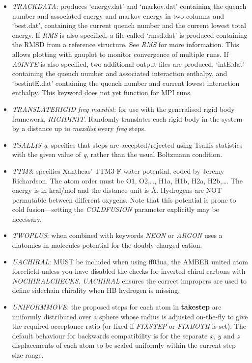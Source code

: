 \documentclass[12pt,a4paper,dvips]{article}
\begin{document}
\begin{itemize}
\item {\it TRACKDATA}: produces `energy.dat' and `markov.dat' containing the quench number and 
associated energy and markov energy in two columns and `best.dat', containing the current quench number and the current lowest
total energy. If {\it RMS\/} is also specified, a file called `rmsd.dat' is produced containing the RMSD from a reference structure.
See {\it RMS\/} for more information. This allows plotting with gnuplot to monitor convergence of multiple runs.
If {\it A9INTE} is also specified, two additional output files are produced, `intE.dat' containing the quench number and associated interaction
enthalpy, and `bestintE.dat' containing the quench number and current lowest interaction enthalpy. This keyword does not yet function for MPI runs.

\item {\it TRANSLATERIGID freq maxdist}: for use with the generalised rigid
body framework, {\it RIGIDINIT}. Randomly translates each rigid body in the
system by a distance up to {\it maxdist} every {\it freq} steps.

\item {\it TSALLIS q\/}: specifies that steps are accepted/rejected using Tsallis statistics with the
given value of {\it q\/}, rather than the usual Boltzmann condition.

\item {\it TTM3\/}: specifies Xantheas' TTM3-F water potential, coded
by Jeremy Richardson.
The atom order must be O1, O2,\ldots, H1a, H1b, H2a, H2b,\ldots.
The energy is in kcal/mol and the distance unit is \AA.
Hydrogens are NOT permutable between different oxygens.
Note that this potential is prone to cold fusion---setting the {\it COLDFUSION\/}
parameter explicitly may be necessary.

\item {\it TWOPLUS\/}: when combined with keywords {\it NEON\/} or {\it ARGON\/}
uses a diatomics-in-molecules potential for the doubly charged cation.

\item {\it UACHIRAL\/}: MUST be included when using ff03ua, the AMBER united atom forcefield unless you have disabled the checks for inverted chiral carbons
 with {\it NOCHIRALCHECKS\/}. {\it UACHIRAL\/} ensures the correct impropers are used to define sidechain chirality when HB hydrogen is missing. 

\item {\it UNIFORMMOVE\/}: the proposed steps for each atom in {\bf takestep} are uniformly
distributed over a sphere whose radius is adjusted on-the-fly to give the required acceptance
ratio (or fixed if {\it FIXSTEP\/} or {\it FIXBOTH\/} is set).
The default behaviour for backwards compatibility is for the separate $x$, $y$ and $z$ displacements
of each atom to be scaled uniformly within the current step size range.


\end{itemize}
\end{document}
